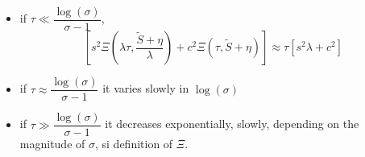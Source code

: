 \documentclass[aps,onecolumn,12pt]{revtex4}
\begin{document}
\begin{itemize}
\item if $\tau\ll\dfrac{\log(\sigma)}{\sigma-1}$, 
	$$
		\left[  s^2 \Xi\left(\lambda\tau,{\dfrac{\tilde{S}+\eta}{\lambda}}\right) + c^2 \Xi\left(\tau,\tilde{S}+\eta\right) \right]
		\approx \tau \left[ s^2\lambda+c^2\right]
	$$
\item if $\tau\approx\dfrac{\log(\sigma)}{\sigma-1}$
	it varies slowly in $\log(\sigma)$
	
\item if $\tau\gg\dfrac{\log(\sigma)}{\sigma-1}$
	it decreases exponentially, slowly, depending on the magnitude of $\sigma$, si definition of $\Xi$.
\end{itemize}
\end{document}
